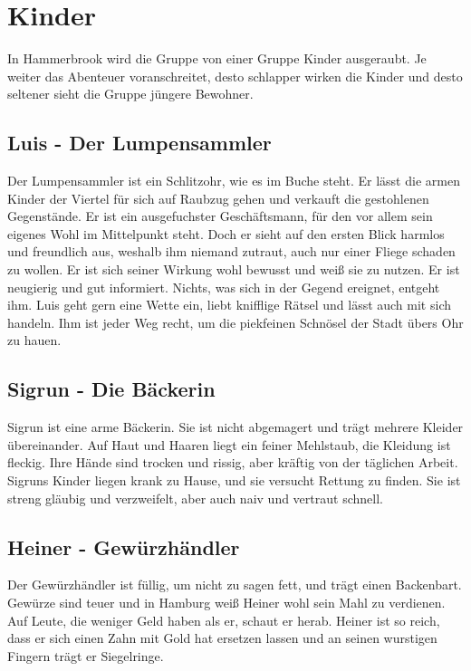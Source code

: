 \section{Kinder}

In Hammerbrook wird die Gruppe von einer Gruppe Kinder ausgeraubt. Je weiter das Abenteuer voranschreitet, desto schlapper wirken die Kinder und desto seltener sieht die Gruppe jüngere Bewohner.

\subsection{Luis - Der Lumpensammler}

Der Lumpensammler ist ein Schlitzohr, wie es im Buche steht. Er lässt die armen Kinder der Viertel für sich auf Raubzug gehen und verkauft die gestohlenen Gegenstände. Er ist ein ausgefuchster Geschäftsmann, für den vor allem sein eigenes Wohl im Mittelpunkt steht. Doch er sieht auf den ersten Blick harmlos und freundlich aus, weshalb ihm niemand zutraut, auch nur einer Fliege schaden zu wollen. Er ist sich seiner Wirkung wohl bewusst und weiß sie zu nutzen. Er ist neugierig und gut informiert. Nichts, was sich in der Gegend ereignet, entgeht ihm. Luis geht gern eine Wette ein, liebt knifflige Rätsel und lässt auch mit sich handeln. Ihm ist jeder Weg recht, um die piekfeinen Schnösel der Stadt übers Ohr zu hauen.

\subsection{Sigrun - Die Bäckerin}

Sigrun ist eine arme Bäckerin. Sie ist nicht abgemagert und trägt mehrere Kleider übereinander. Auf Haut und Haaren liegt ein feiner Mehlstaub, die Kleidung ist fleckig. Ihre Hände sind trocken und rissig, aber kräftig von der täglichen Arbeit. Sigruns Kinder liegen krank zu Hause, und sie versucht Rettung zu finden. Sie ist streng gläubig und verzweifelt, aber auch naiv und vertraut schnell.

\subsection{Heiner - Gewürzhändler}

Der Gewürzhändler ist füllig, um nicht zu sagen fett, und trägt einen Backenbart. Gewürze sind teuer und in Hamburg weiß Heiner wohl sein Mahl zu verdienen. Auf Leute, die weniger Geld haben als er, schaut er herab. Heiner ist so reich, dass er sich einen Zahn mit Gold hat ersetzen lassen und an seinen wurstigen Fingern trägt er Siegelringe.

